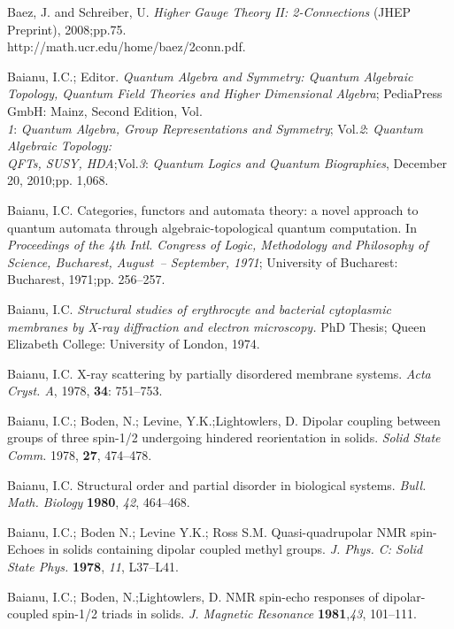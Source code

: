 \documentclass[12pt]{article}
\theoremstyle{plain}
\theoremstyle{definition}
\numberwithin{equation}{section}
\begin{document}
\begin{thebibliography}{199}

Baez, J. and  Schreiber, U. {\em  Higher Gauge Theory II: 2-Connections} (JHEP Preprint), 2008;pp.75. \\
 http://math.ucr.edu/home/baez/2conn.pdf.

Baianu, I.C.; Editor. {\em Quantum Algebra and Symmetry: Quantum Algebraic Topology, Quantum Field Theories and Higher Dimensional Algebra}; PediaPress GmbH: Mainz, Second Edition, Vol. \\{\em 1}: {\em Quantum Algebra, Group Representations and Symmetry}; Vol.{\em 2}: {\em Quantum Algebraic Topology: \\ QFTs, SUSY, HDA};Vol.{\em 3}: {\em Quantum Logics and Quantum Biographies}, December 20, 2010;pp. 1,068.

Baianu, I.C. Categories, functors and automata theory: a novel approach to quantum automata through algebraic-topological quantum computation. In {\em  Proceedings of the 4th Intl. Congress of Logic, Methodology and Philosophy of Science, Bucharest, August~-- September, 1971}; University of Bucharest: Bucharest, 1971;pp. 256--257.

Baianu, I.C. \emph{Structural studies of erythrocyte and bacterial cytoplasmic membranes by X-ray diffraction and electron microscopy.} PhD Thesis; Queen Elizabeth College: University of London, 1974.

Baianu, I.C.  X-ray scattering by partially disordered membrane systems. 
\emph{Acta Cryst. A}, 1978, {\bf 34}: 751--753.

Baianu, I.C.; Boden, N.; Levine, Y.K.;Lightowlers, D.  Dipolar coupling between groups of three spin-1/2 undergoing hindered reorientation in solids. {\it Solid State Comm.} 1978, {\bf 27}, 474--478.

Baianu, I.C.  Structural order and partial disorder in biological systems. {\em Bull. Math. Biology} {\bf 1980}, {\em 42}, 464--468.

Baianu, I.C.; Boden N.; Levine Y.K.; Ross S.M.  Quasi-quadrupolar NMR spin-Echoes in solids containing dipolar coupled methyl groups.  {\em J. Phys.  C: Solid State Phys.}
{\bf 1978}, {\em 11}, L37--L41.

Baianu, I.C.; Boden, N.;Lightowlers, D.  NMR spin-echo responses of dipolar-coupled spin-1/2 triads in solids. {\em J. Magnetic Resonance} {\bf 1981},{\em 43}, 101--111.


\end{thebibliography}
\end{document}
